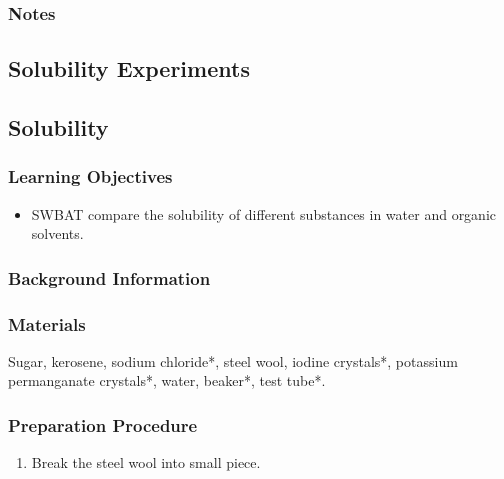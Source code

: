 \subsubsection*{Notes}


\subsection{Solubility Experiments}

\subsection{Solubility}

\subsubsection*{Learning Objectives}
\begin{itemize}
\item{SWBAT compare the solubility of different substances in water and organic solvents.}
\end{itemize}

\subsubsection*{Background Information}


\subsubsection*{Materials}
Sugar, kerosene, sodium chloride*, steel wool, iodine crystals*, potassium permanganate crystals*, water, beaker*, test tube*.

\subsubsection*{Preparation Procedure}
\begin{enumerate}
\item{Break the steel wool into small piece.}
\end{enumerate}

